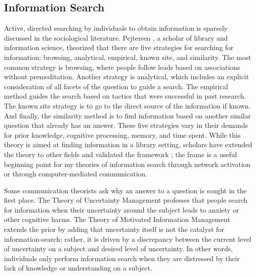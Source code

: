 \hypertarget{information-search}{%
\subsection{Information Search}\label{information-search}}

Active, directed searching by individuals to obtain information is sparsely
discussed in the sociological literature. Pejtersen \citet{pejtersenDesignComputeraidedUsersystem1984}, a scholar
of library and information science, theorized that there are five strategies for
searching for information: browsing, analytical, empirical, known site, and similarity. 
The most common strategy is browsing, where people
follow leads based on associations without premeditation. Another strategy is
analytical, which includes an explicit consideration of all facets of the
question to guide a search. The empirical method guides the search based on
tactics that were successful in past research. The known site strategy is to go
to the direct source of the information if known. And finally, the similarity
method is to find information based on another similar question that already has
an answer. These five strategies vary in their demands for prior knowledge,
cognitive processing, memory, and time spent. While this theory is aimed at
finding information in a library setting, scholars have extended the theory to
other fields and validated the framework
\citep{fidelHumanInformationInteraction2012}; the frame is a useful beginning point
for my theories of information search through network activation or through
computer-mediated communication.

Some communication theorists ask why an answer to a question is sought in the
first place. The Theory of Uncertainty Management
\citep{brashersCommunicationUncertaintyManagement2001} professes that people search
for information when their uncertainty around the subject leads to anxiety or
other cognitive harms. The Theory of Motivated Information Management
\citep{afifiTheoryMotivatedInformation2004, afifiSeekingInformationSexual2006}
extends the prior by adding that uncertainty itself is not the catalyst for
information-search; rather, it is driven by a discrepancy between the current
level of uncertainty on a subject and desired level of uncertainty. In other
words, individuals only perform information search when they are distressed by
their lack of knowledge or understanding on a subject.

